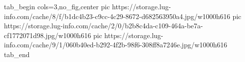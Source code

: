  
 
 
 
 


\ifcmt
  tab_begin cols=3,no_fig,center
     pic https://storage.lug-info.com/cache/8/f/b1dc4b23-c9cc-4c29-8672-d682563950a4.jpg/w1000h616%
		 pic https://storage.lug-info.com/cache/2/0/b2b8c4da-c109-464a-be7a-cf1772071d98.jpg/w1000h616%
		 pic https://storage.lug-info.com/cache/9/1/060b40ed-b292-4f2b-98f6-308ff8a7246e.jpg/w1000h616%
  tab_end
\fi
